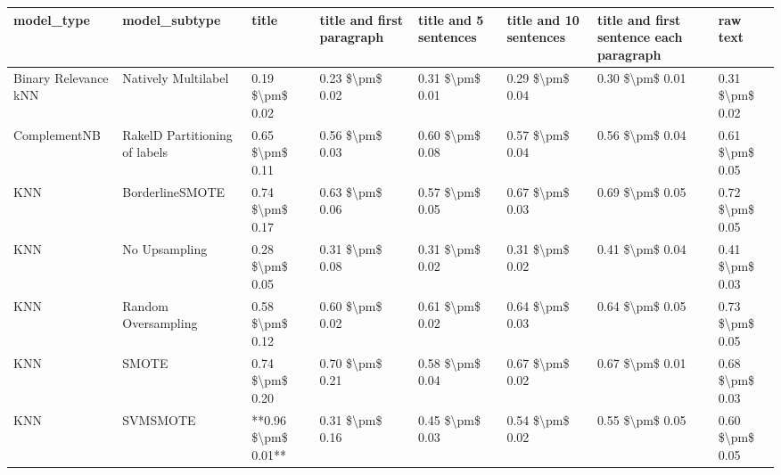 \begin{tabular}{llllllll}
\toprule
                     model\_type &                 model\_subtype &               title & title and first paragraph & title and 5 sentences & title and 10 sentences & title and first sentence each paragraph &        raw text \\
\midrule
           Binary Relevance kNN &           Natively Multilabel &     0.19 \$\textbackslash pm\$ 0.02 &           0.23 \$\textbackslash pm\$ 0.02 &       0.31 \$\textbackslash pm\$ 0.01 &        0.29 \$\textbackslash pm\$ 0.04 &                         0.30 \$\textbackslash pm\$ 0.01 & 0.31 \$\textbackslash pm\$ 0.02 \\
                   ComplementNB & RakelD Partitioning of labels &     0.65 \$\textbackslash pm\$ 0.11 &           0.56 \$\textbackslash pm\$ 0.03 &       0.60 \$\textbackslash pm\$ 0.08 &        0.57 \$\textbackslash pm\$ 0.04 &                         0.56 \$\textbackslash pm\$ 0.04 & 0.61 \$\textbackslash pm\$ 0.05 \\
                            KNN &               BorderlineSMOTE &     0.74 \$\textbackslash pm\$ 0.17 &           0.63 \$\textbackslash pm\$ 0.06 &       0.57 \$\textbackslash pm\$ 0.05 &        0.67 \$\textbackslash pm\$ 0.03 &                         0.69 \$\textbackslash pm\$ 0.05 & 0.72 \$\textbackslash pm\$ 0.05 \\
                            KNN &                 No Upsampling &     0.28 \$\textbackslash pm\$ 0.05 &           0.31 \$\textbackslash pm\$ 0.08 &       0.31 \$\textbackslash pm\$ 0.02 &        0.31 \$\textbackslash pm\$ 0.02 &                         0.41 \$\textbackslash pm\$ 0.04 & 0.41 \$\textbackslash pm\$ 0.03 \\
                            KNN &           Random Oversampling &     0.58 \$\textbackslash pm\$ 0.12 &           0.60 \$\textbackslash pm\$ 0.02 &       0.61 \$\textbackslash pm\$ 0.02 &        0.64 \$\textbackslash pm\$ 0.03 &                         0.64 \$\textbackslash pm\$ 0.05 & 0.73 \$\textbackslash pm\$ 0.05 \\
                            KNN &                         SMOTE &     0.74 \$\textbackslash pm\$ 0.20 &           0.70 \$\textbackslash pm\$ 0.21 &       0.58 \$\textbackslash pm\$ 0.04 &        0.67 \$\textbackslash pm\$ 0.02 &                         0.67 \$\textbackslash pm\$ 0.01 & 0.68 \$\textbackslash pm\$ 0.03 \\
                            KNN &                      SVMSMOTE & **0.96 \$\textbackslash pm\$ 0.01** &           0.31 \$\textbackslash pm\$ 0.16 &       0.45 \$\textbackslash pm\$ 0.03 &        0.54 \$\textbackslash pm\$ 0.02 &                         0.55 \$\textbackslash pm\$ 0.05 & 0.60 \$\textbackslash pm\$ 0.05 \\

\end{tabular}

